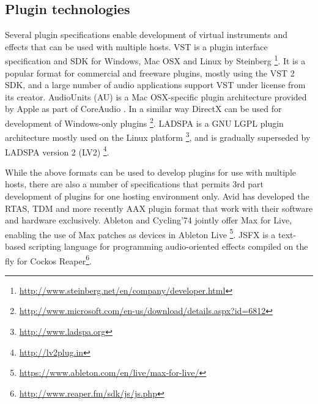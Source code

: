 \documentclass{article}
\begin{document}




\subsection{Plugin technologies}\label{sec:plugin-technologies}

Several plugin specifications enable development of virtual instruments and effects that can be used with multiple hosts.
VST is a plugin interface specification and SDK for Windows, Mac OSX and Linux by Steinberg \footnote{\href{http://www.steinberg.net/en/company/developer.html}{http://www.steinberg.net/en/company/developer.html}}.
It is a popular format for commercial and freeware plugins, mostly using the VST 2 SDK, and a large number of audio applications support VST under license from its creator.
AudioUnits (AU) is a Mac OSX-specific plugin architecture provided by Apple as part of CoreAudio \cite{apple2014:au}.
In a similar way DirectX can be used for development of Windows-only plugins \footnote{\href{http://www.microsoft.com/en-us/download/details.aspx?id=6812}{http://www.microsoft.com/en-us/download/details.aspx?id=6812}}.
LADSPA is a GNU LGPL plugin architecture mostly used on the Linux platform \footnote{\href{http://www.ladspa.org}{http://www.ladspa.org}}, and is gradually superseded by LADSPA version 2 (LV2) \footnote{\href{http://lv2plug.in}{http://lv2plug.in}}.

While the above formats can be used to develop plugins for use with multiple hosts, there are also a number of specifications that permits 3rd part development of plugins for one hosting environment only.
Avid has developed the RTAS, TDM and more recently AAX plugin format that work with their software and hardware exclusively.
Ableton and Cycling'74 jointly offer Max for Live, enabling the use of Max patches as devices in Ableton Live \footnote{\href{https://www.ableton.com/en/live/max-for-live/}{https://www.ableton.com/en/live/max-for-live/}}. JSFX is a text-based scripting language for programming audio-oriented effects compiled on the fly for Cockos Reaper\footnote{\href{http://www.reaper.fm/sdk/js/js.php}{http://www.reaper.fm/sdk/js/js.php}}.
\end{document}

